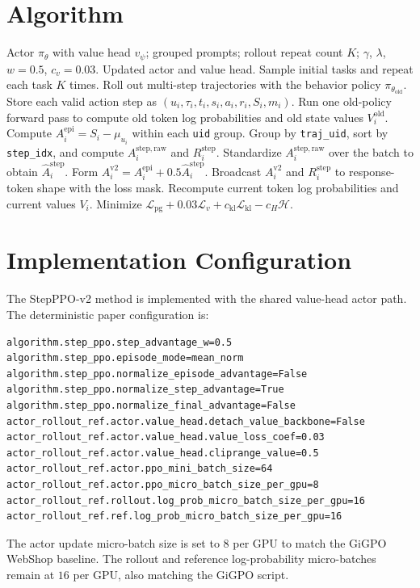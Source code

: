 \documentclass[10pt]{article}
\begin{document}
\section{Algorithm}
\begin{algorithm}[h]
\caption{StepPPO-v2 training iteration}
\begin{algorithmic}[1]
\Require Actor $\pi_\theta$ with value head $v_\psi$; grouped prompts; rollout repeat count $K$; $\gamma$, $\lambda$, $w=0.5$, $c_v=0.03$.
\Ensure Updated actor and value head.
\State Sample initial tasks and repeat each task $K$ times.
\State Roll out multi-step trajectories with the behavior policy $\pi_{\theta_{\mathrm{old}}}$.
\State Store each valid action step as $(u_i,\tau_i,t_i,s_i,a_i,r_i,S_i,m_i)$.
\State Run one old-policy forward pass to compute old token log probabilities and old state values $V_i^{\mathrm{old}}$.
\State Compute $A_i^{\mathrm{epi}}=S_i-\mu_{u_i}$ within each \texttt{uid} group.
\State Group by \texttt{traj\_uid}, sort by \texttt{step\_idx}, and compute $A_i^{\mathrm{step,raw}}$ and $R_i^{\mathrm{step}}$.
\State Standardize $A_i^{\mathrm{step,raw}}$ over the batch to obtain $\widehat A_i^{\mathrm{step}}$.
\State Form $A_i^{\mathrm{v2}}=A_i^{\mathrm{epi}}+0.5\widehat A_i^{\mathrm{step}}$.
\State Broadcast $A_i^{\mathrm{v2}}$ and $R_i^{\mathrm{step}}$ to response-token shape with the loss mask.
  \State Recompute current token log probabilities and current values $V_i$.
  \State Minimize $\mathcal L_{\mathrm{pg}}+0.03\mathcal L_v+c_{\mathrm{kl}}\mathcal L_{\mathrm{kl}}-c_H\mathcal H$.
\EndFor
\end{algorithmic}
\end{algorithm}

\section{Implementation Configuration}
The StepPPO-v2 method is implemented with the shared value-head actor path. The deterministic paper configuration is:
\begin{verbatim}
algorithm.step_ppo.step_advantage_w=0.5
algorithm.step_ppo.episode_mode=mean_norm
algorithm.step_ppo.normalize_episode_advantage=False
algorithm.step_ppo.normalize_step_advantage=True
algorithm.step_ppo.normalize_final_advantage=False
actor_rollout_ref.actor.value_head.detach_value_backbone=False
actor_rollout_ref.actor.value_head.value_loss_coef=0.03
actor_rollout_ref.actor.value_head.cliprange_value=0.5
actor_rollout_ref.actor.ppo_mini_batch_size=64
actor_rollout_ref.actor.ppo_micro_batch_size_per_gpu=8
actor_rollout_ref.rollout.log_prob_micro_batch_size_per_gpu=16
actor_rollout_ref.ref.log_prob_micro_batch_size_per_gpu=16
\end{verbatim}
The actor update micro-batch size is set to $8$ per GPU to match the GiGPO WebShop baseline. The rollout and reference log-probability micro-batches remain at $16$ per GPU, also matching the GiGPO script.
\end{document}
